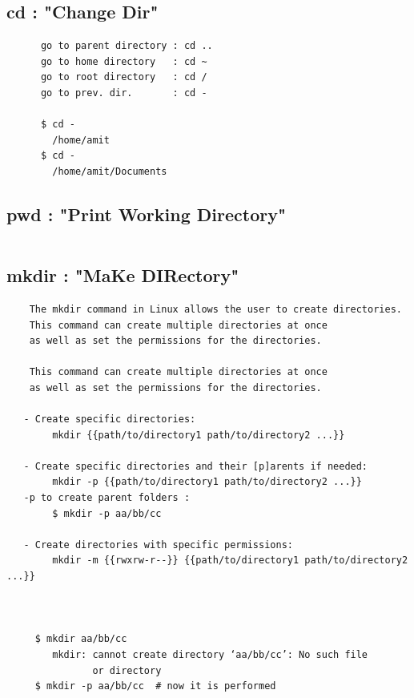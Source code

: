 \documentclass[a4paper,12pt]{article}
\begin{document}
\subsection{cd       : "Change Dir"}
\begin{verbatim}
      go to parent directory : cd ..
      go to home directory   : cd ~
      go to root directory   : cd /
      go to prev. dir.       : cd -  

      $ cd -
        /home/amit
      $ cd -
        /home/amit/Documents

\end{verbatim}


\subsection{pwd      : "Print Working Directory"}
\begin{verbatim}

\end{verbatim}



\subsection{mkdir    : "MaKe DIRectory"}
\begin{verbatim}
    The mkdir command in Linux allows the user to create directories. 
    This command can create multiple directories at once 
    as well as set the permissions for the directories.

    This command can create multiple directories at once
    as well as set the permissions for the directories.

   - Create specific directories:
        mkdir {{path/to/directory1 path/to/directory2 ...}}

   - Create specific directories and their [p]arents if needed:
        mkdir -p {{path/to/directory1 path/to/directory2 ...}}
   -p to create parent folders : 
        $ mkdir -p aa/bb/cc

   - Create directories with specific permissions:
        mkdir -m {{rwxrw-r--}} {{path/to/directory1 path/to/directory2 ...}}



     $ mkdir aa/bb/cc
        mkdir: cannot create directory ‘aa/bb/cc’: No such file
               or directory
     $ mkdir -p aa/bb/cc  # now it is performed     
     
\end{verbatim}
\end{document}
